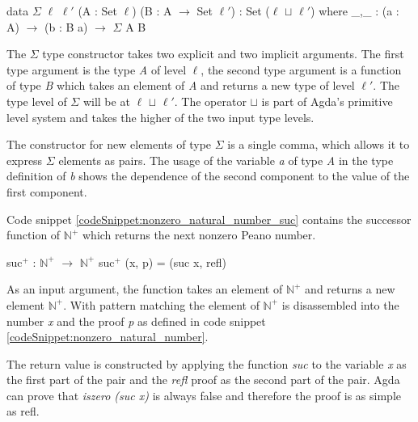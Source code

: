 \begin{codesnippet}[mathescape=true, caption={Definition of $\Sigma$ datatype}, label={codeSnippet:sigma}]
data $\Sigma$ {$\ell$ $\ell '$} (A : Set $\ell$) (B : A $\rightarrow$ Set $\ell '$)
 : Set ($\ell$ $\sqcup$ $\ell '$) where
_,_ : (a : A) $\rightarrow$ (b : B a) $\rightarrow$ $\Sigma$ A B
\end{codesnippet}

The $\Sigma$ type constructor takes two explicit and two implicit arguments. 
The first type argument is the type \emph{A} of level $\ell$, the second type argument is a function of type \emph{B} which takes an element of \emph{A} and returns a new type of level $\ell '$.
The type level of $\Sigma$ will be at $\ell$ $\sqcup$ $\ell '$. The operator $\sqcup$ is part of Agda's primitive level system and takes the higher of the two input type levels.

The constructor for new elements of type $\Sigma$ is a single comma, which allows it to express $\Sigma$ elements as pairs.
The usage of the variable \emph{a} of type \emph{A} in the type definition of \emph{b} shows the dependence of the second component to the value of the first component.

Code snippet \ref{codeSnippet:nonzero_natural_number_suc} contains the successor function of $\mathbb{N}^+$ which returns the next nonzero Peano number.
\begin{codesnippet}[mathescape=true, caption={Successor function of $\mathbb{N}^+$}, label={codeSnippet:nonzero_natural_number_suc}]
suc$^+$ : $\mathbb{N}^+$ $\rightarrow$ $\mathbb{N}^+$
suc$^+$ (x, p) = (suc x, refl)
\end{codesnippet}

As an input argument, the function takes an element of $\mathbb{N}^+$ and returns a new element $\mathbb{N}^+$. 
With pattern matching the element of $\mathbb{N}^+$ is disassembled into the number \emph{x} and the proof \emph{p} as defined in code snippet \ref{codeSnippet:nonzero_natural_number}.

The return value is constructed by applying the function \emph{suc} to the variable \emph{x} as the first part of the pair and the \emph{refl} proof as the second part of the pair.
Agda can prove that \emph{iszero (suc x)} is always false and therefore the proof is as simple as refl.